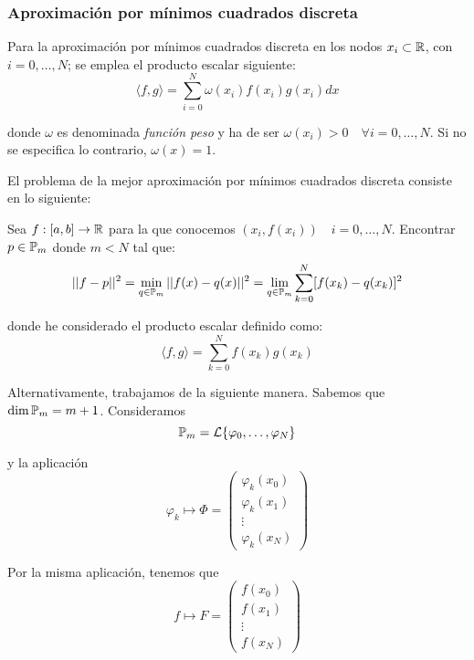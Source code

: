 \subsubsection{Aproximación por mínimos cuadrados discreta}
Para la aproximación por mínimos cuadrados discreta en los nodos $x_i\subset \mathbb{R}$, con $i=0,\dots, N$; se emplea el producto escalar siguiente:
\begin{equation*}
    \langle f,g\rangle = \sum_{i=0}^N \omega(x_i)f(x_i)g(x_i)dx
\end{equation*}

donde $\omega$ es denominada \emph{función peso} y ha de ser $\omega(x_i) > 0 \quad \forall i=0,\dots, N$. Si no se especifica lo contrario, $\omega(x)=1$.

El problema de la mejor aproximación por mínimos cuadrados discreta consiste en lo siguiente:

Sea $f:[a,b]\to \mathbb{R}$ para la que conocemos $(x_i, f(x_i))\quad i=0,\dots, N$. Encontrar $p\in \mathbb{P}_m$ donde $m<N$ tal que:
\begin{equation*}
    ||f-p||^2 = \min_{q\in \mathbb{P}_m} ||f(x)-q(x)||^2 = \lim_{q\in \mathbb{P}_m} \sum_{k=0}^N [f(x_k)-q(x_k)]^2
\end{equation*}

donde he considerado el producto escalar definido como:
\begin{equation*}
    \langle f,g \rangle = \sum_{k=0}^N f(x_k)g(x_k)
\end{equation*}

Alternativamente, trabajamos de la siguiente manera. Sabemos que $\dim \mathbb{P}_m = m+1$. Consideramos 
\begin{equation*}
    \mathbb{P}_m = \mathcal{L}\{\varphi_0,\dots,\varphi_N\}
\end{equation*}

y la aplicación
\begin{equation*}
    \varphi_k \longmapsto \Phi=\left(\begin{array}{c}
        \varphi_k (x_0) \\ \varphi_k(x_1) \\ \vdots \\ \varphi_k(x_N)
    \end{array}\right)
\end{equation*}


Por la misma aplicación, tenemos que
\begin{equation*}
    f\longmapsto F=\left(\begin{array}{c}
        f(x_0) \\ f(x_1) \\ \vdots \\ f(x_N)
    \end{array}\right)
\end{equation*}


